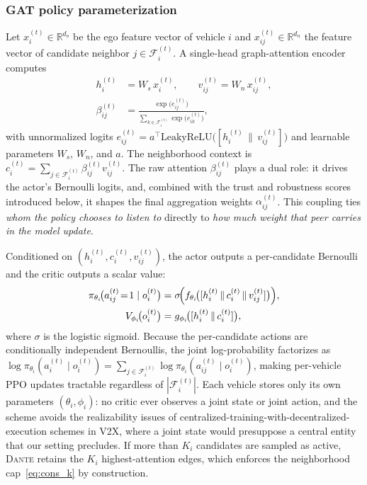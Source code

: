 \subsubsection{GAT policy parameterization}
\label{subsubsec:gatppo}

Let $x_i^{(t)}\in\mathbb{R}^{d_o}$ be the ego feature vector of vehicle $i$ and $x_{ij}^{(t)}\in\mathbb{R}^{d_n}$ the feature vector of candidate neighbor $j\in\mathcal{F}_i^{(t)}$. A single-head graph-attention encoder computes
\begin{equation}
\label{eq:gat}
\begin{split}
    h_i^{(t)} &= W_s\, x_i^{(t)},\qquad v_{ij}^{(t)} = W_n\, x_{ij}^{(t)},\\
    \beta_{ij}^{(t)} &= \frac{\exp\bigl(e_{ij}^{(t)}\bigr)}{\sum_{k\in\mathcal{F}_i^{(t)}}\exp\bigl(e_{ik}^{(t)}\bigr)},
\end{split}
\end{equation}
with unnormalized logits $e_{ij}^{(t)}=a^{\!\top}\mathrm{LeakyReLU}\!\bigl([h_i^{(t)}\,\|\,v_{ij}^{(t)}]\bigr)$ and learnable parameters $W_s$, $W_n$, and $a$. The neighborhood context is $c_i^{(t)}=\sum_{j\in\mathcal{F}_i^{(t)}}\beta_{ij}^{(t)}v_{ij}^{(t)}$. The raw attention $\beta_{ij}^{(t)}$ plays a dual role: it drives the actor's Bernoulli logits, and, combined with the trust and robustness scores introduced below, it shapes the final aggregation weights $\alpha_{ij}^{(t)}$. This coupling ties \emph{whom the policy chooses to listen to} directly to \emph{how much weight that peer carries in the model update}.

Conditioned on $(h_i^{(t)},c_i^{(t)},v_{ij}^{(t)})$, the actor outputs a per-candidate Bernoulli and the critic outputs a scalar value:
\begin{equation}
\label{eq:actor_critic}
\begin{split}
    \pi_{\theta_i}\!\bigl(a_{ij}^{(t)}\!=\!1\mid o_i^{(t)}\bigr) &= \sigma\!\Bigl(f_{\theta_i}\!\bigl([h_i^{(t)}\,\|\,c_i^{(t)}\,\|\,v_{ij}^{(t)}]\bigr)\Bigr),\\
    V_{\phi_i}\!\bigl(o_i^{(t)}\bigr) &= g_{\phi_i}\!\bigl([h_i^{(t)}\,\|\,c_i^{(t)}]\bigr),
\end{split}
\end{equation}
where $\sigma$ is the logistic sigmoid. Because the per-candidate actions are conditionally independent Bernoullis, the joint log-probability factorizes as $\log\pi_{\theta_i}(a_i^{(t)}\mid o_i^{(t)})=\sum_{j\in\mathcal{F}_i^{(t)}}\log\pi_{\theta_i}(a_{ij}^{(t)}\mid o_i^{(t)})$, making per-vehicle PPO updates tractable regardless of $|\mathcal{F}_i^{(t)}|$. Each vehicle stores only its own parameters $(\theta_i,\phi_i)$: no critic ever observes a joint state or joint action, and the scheme avoids the realizability issues of centralized-training-with-decentralized-execution schemes in V2X, where a joint state would presuppose a central entity that our setting precludes. If more than $K_i$ candidates are sampled as active, \textsc{Dante} retains the $K_i$ highest-attention edges, which enforces the neighborhood cap~\eqref{eq:cons_k} by construction.

